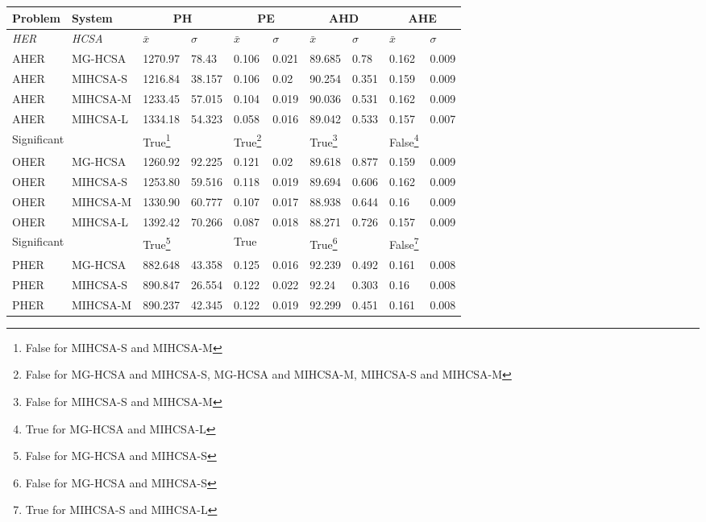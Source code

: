 \begin{table}[H]
	\centering\small
		\begin{minipage}{\textwidth}
		\begin{tabular}{llllllllll}
		\toprule
		\textbf{Problem} & \textbf{System} & \multicolumn{2}{c}{\textbf{PH}} & \multicolumn{2}{c}{\textbf{PE}} & \multicolumn{2}{c}{\textbf{AHD}} &\multicolumn{2}{c}{\textbf{AHE}} \\ 
		\midrule
		\emph{HER} & \emph{HCSA} & $\bar{x}$ & $\sigma$ & $\bar{x}$ & $\sigma$ & $\bar{x}$ & $\sigma$ & $\bar{x}$ & $\sigma$ \\ 
		\toprule
		AHER & MG-HCSA & 1270.97 & 78.43 & 0.106 & 0.021 & 89.685 & 0.78 & 0.162 & 0.009 \\ 
		AHER & MIHCSA-S & 1216.84 & 38.157 & 0.106 & 0.02 & 90.254 & 0.351 & 0.159 & 0.009 \\ 
		AHER & MIHCSA-M & 1233.45 & 57.015 & 0.104 & 0.019 & 90.036 & 0.531 & 0.162 & 0.009 \\ 
		AHER & MIHCSA-L & 1334.18 & 54.323 & 0.058 & 0.016 & 89.042 & 0.533 & 0.157 & 0.007 \\ 
		\multicolumn{2}{l}{Significant} & True\footnote{False for MIHCSA-S and MIHCSA-M} & & True\footnote{False for MG-HCSA and MIHCSA-S, MG-HCSA and MIHCSA-M, MIHCSA-S and MIHCSA-M} & & True\footnote{False for MIHCSA-S and MIHCSA-M} & & False\footnote{True for MG-HCSA and MIHCSA-L} & \\ 
		\midrule
		OHER & MG-HCSA & 1260.92 & 92.225 & 0.121 & 0.02 & 89.618 & 0.877 & 0.159 & 0.009 \\ 
		OHER & MIHCSA-S & 1253.80 & 59.516 & 0.118 & 0.019 & 89.694 & 0.606 & 0.162 & 0.009 \\ 
		OHER & MIHCSA-M & 1330.90 & 60.777 & 0.107 & 0.017 & 88.938 & 0.644 & 0.16 & 0.009 \\ 
		OHER & MIHCSA-L & 1392.42 & 70.266 & 0.087 & 0.018 & 88.271 & 0.726 & 0.157 & 0.009 \\ 
		\multicolumn{2}{l}{Significant} & True\footnote{False for MG-HCSA and MIHCSA-S} & & True & & True\footnote{False for MG-HCSA and MIHCSA-S} & & False\footnote{True for MIHCSA-S and MIHCSA-L} & \\ 
		\midrule
		PHER & MG-HCSA & 882.648 & 43.358 & 0.125 & 0.016 & 92.239 & 0.492 & 0.161 & 0.008 \\ 
		PHER & MIHCSA-S & 890.847 & 26.554 & 0.122 & 0.022 & 92.24 & 0.303 & 0.16 & 0.008 \\ 
		PHER & MIHCSA-M & 890.237 & 42.345 & 0.122 & 0.019 & 92.299 & 0.451 & 0.161 & 0.008 \\ 

\end{tabular}
\end{minipage}
\end{table}
